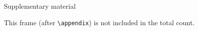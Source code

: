 \documentclass[aspectratio=169]{beamer}
\begin{document}
\makefinalslide

\appendix

\begin{frame}{Supplementary material}

  This frame (after \texttt{\textbackslash{}appendix}) is not included in the total count.

\end{frame}
\end{document}
